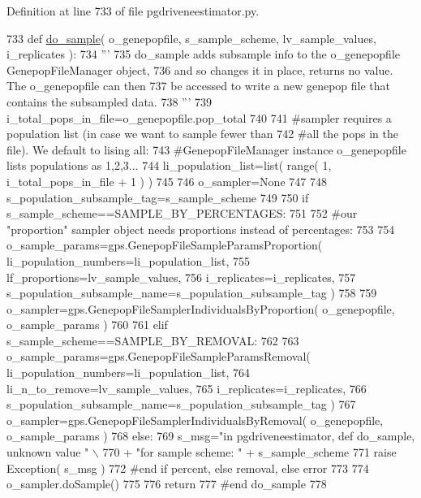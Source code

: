 Definition at line 733 of file pgdriveneestimator.\+py.


\begin{DoxyCode}
733 \textcolor{keyword}{def }\hyperlink{namespacenegui_1_1pgdriveneestimator_aa5f7fc02442df628112ba81a98a3691e}{do\_sample}( o\_genepopfile, s\_sample\_scheme, lv\_sample\_values, i\_replicates ):
734     \textcolor{stringliteral}{'''}
735 \textcolor{stringliteral}{    do\_sample adds subsample info to the o\_genepopfile GenepopFileManager object,}
736 \textcolor{stringliteral}{    and so changes it in place, returns no value.  The o\_genepopfile can then}
737 \textcolor{stringliteral}{    be accessed to write a new genepop file that contains the subsampled data.}
738 \textcolor{stringliteral}{    '''}
739     i\_total\_pops\_in\_file=o\_genepopfile.pop\_total
740 
741     \textcolor{comment}{#sampler requires a population list (in case we want to sample fewer than}
742     \textcolor{comment}{#all the pops in the file). We default to lising all:}
743     \textcolor{comment}{#GenepopFileManager instance o\_genepopfile lists populations as 1,2,3...}
744     li\_population\_list=list( range( 1, i\_total\_pops\_in\_file + 1 ) )
745 
746     o\_sampler=\textcolor{keywordtype}{None}  
747 
748     s\_population\_subsample\_tag=s\_sample\_scheme
749 
750     \textcolor{keywordflow}{if} s\_sample\_scheme==SAMPLE\_BY\_PERCENTAGES:
751 
752         \textcolor{comment}{#our "proportion" sampler object needs proportions instead of percentages:}
753 
754         o\_sample\_params=gps.GenepopFileSampleParamsProportion( li\_population\_numbers=li\_population\_list,
755                                                 lf\_proportions=lv\_sample\_values,
756                                                 i\_replicates=i\_replicates,
757                                                 s\_population\_subsample\_name=s\_population\_subsample\_tag )
758 
759         o\_sampler=gps.GenepopFileSamplerIndividualsByProportion( o\_genepopfile, o\_sample\_params )
760 
761     \textcolor{keywordflow}{elif} s\_sample\_scheme==SAMPLE\_BY\_REMOVAL:
762 
763         o\_sample\_params=gps.GenepopFileSampleParamsRemoval( li\_population\_numbers=li\_population\_list,
764                                                 li\_n\_to\_remove=lv\_sample\_values,
765                                                 i\_replicates=i\_replicates,
766                                                 s\_population\_subsample\_name=s\_population\_subsample\_tag )
767         o\_sampler=gps.GenepopFileSamplerIndividualsByRemoval( o\_genepopfile, o\_sample\_params )
768     \textcolor{keywordflow}{else}:
769         s\_msg=\textcolor{stringliteral}{"in pgdriveneestimator, def do\_sample, unknown value "} \(\backslash\)
770                 + \textcolor{stringliteral}{"for sample scheme: "} + s\_sample\_scheme
771         \textcolor{keywordflow}{raise} Exception( s\_msg )
772     \textcolor{comment}{#end if percent, else removal, else error}
773 
774     o\_sampler.doSample()
775 
776     \textcolor{keywordflow}{return}
777 \textcolor{comment}{#end do\_sample}
778 
\end{DoxyCode}
